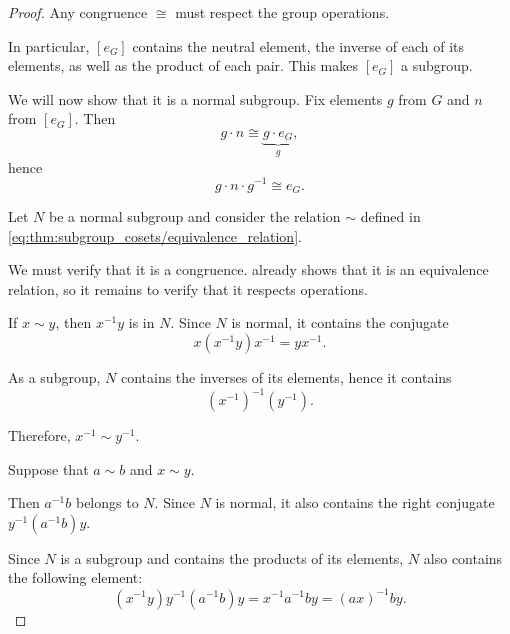 \begin{proof}
   Any congruence \( {\cong} \) must respect the group operations.

  In particular, \( [e_G] \) contains the neutral element, the inverse of each of its elements, as well as the product of each pair. This makes \( [e_G] \) a subgroup.

  We will now show that it is a normal subgroup. Fix elements \( g \) from \( G \) and \( n \) from \( [e_G] \). Then
  \begin{equation*}
    g \cdot n \cong \underbrace{g \cdot e_G}_{g},
  \end{equation*}
  hence
  \begin{equation*}
    g \cdot n \cdot g^{-1} \cong e_G.
  \end{equation*}

   Let \( N \) be a normal subgroup and consider the relation \( {\sim} \) defined in \eqref{eq:thm:subgroup_cosets/equivalence_relation}.

  We must verify that it is a congruence.  already shows that it is an equivalence relation, so it remains to verify that it respects operations.

   If \( x \sim y \), then \( x^{-1} y \) is in \( N \). Since \( N \) is normal, it contains the conjugate
  \begin{equation*}
    x (x^{-1} y) x^{-1} = y x^{-1}.
  \end{equation*}

  As a subgroup, \( N \) contains the inverses of its elements, hence it contains
  \begin{equation*}
    (x^{-1})^{-1} (y^{-1}).
  \end{equation*}

  Therefore, \( x^{-1} \sim y^{-1} \).

   Suppose that \( a \sim b \) and \( x \sim y \).

  Then \( a^{-1} b \) belongs to \( N \). Since \( N \) is normal, it also contains the right conjugate \( y^{-1} (a^{-1} b) y \).

  Since \( N \) is a subgroup and contains the products of its elements, \( N \) also contains the following element:
  \begin{equation*}
    (x^{-1} y) y^{-1} (a^{-1} b) y = x^{-1} a^{-1} b y = (a x)^{-1} b y.
  \end{equation*}


\end{proof}
